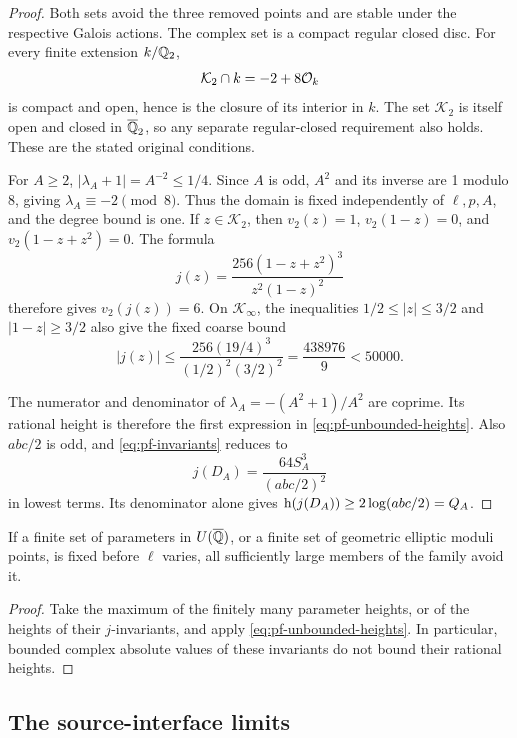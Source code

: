 \begin{proof}
Both sets avoid the three removed points and are stable under the
respective Galois actions. The complex set is a compact regular closed
disc. For every finite extension \(k/\mathbb Q_2\),
\[
 \mathcal K_2\cap k=-2+8\mathcal O_k
\]
is compact and open, hence is the closure of its interior in \(k\).
The set \(\mathcal K_2\) is itself open and closed in
\(\overline{\mathbb Q}_2\), so any separate regular-closed requirement also
holds. These are the stated original conditions.

For \(A\ge2\), \(|\lambda_A+1|=A^{-2}\le1/4\). Since \(A\) is odd,
\(A^2\) and its inverse are 1 modulo 8, giving
\(\lambda_A\equiv-2\pmod8\). Thus the domain is fixed independently of
\(\ell,p,A\), and the degree bound is one. If \(z\in\mathcal K_2\),
then \(v_2(z)=1\), \(v_2(1-z)=0\), and
\(v_2(1-z+z^2)=0\). The formula
\[
 j(z)=\frac{256(1-z+z^2)^3}{z^2(1-z)^2}
\]
therefore gives \(v_2(j(z))=6\).
On \(\mathcal K_\infty\), the inequalities
\(1/2\le|z|\le3/2\) and \(|1-z|\ge3/2\) also give the fixed coarse bound
\[
 |j(z)|\le
 \frac{256(19/4)^3}{(1/2)^2(3/2)^2}
 =\frac{438976}{9}<50000.
\]

The numerator and denominator of \(\lambda_A=-(A^2+1)/A^2\)
are coprime. Its rational height is therefore the first expression in
\eqref{eq:pf-unbounded-heights}. Also \(abc/2\) is odd, and
\eqref{eq:pf-invariants} reduces to
\[
 j(D_A)=\frac{64S_A^3}{(abc/2)^2}
\]
in lowest terms. Its denominator alone gives
\(\mathrm h(j(D_A))\ge2\log(abc/2)=Q_A\).
\end{proof}

\begin{corollary}
\label{cor:powerfree-finite-exception}
If a finite set of parameters in \(U(\overline{\mathbb Q})\), or a finite set
of geometric elliptic moduli points, is fixed before \(\ell\) varies,
all sufficiently large members of the family avoid it.
\end{corollary}

\begin{proof}
Take the maximum of the finitely many parameter heights, or of the
heights of their \(j\)-invariants, and apply
\eqref{eq:pf-unbounded-heights}. In particular, bounded complex absolute
values of these invariants do not bound their rational heights.
\end{proof}

\subsection{The source-interface limits}

